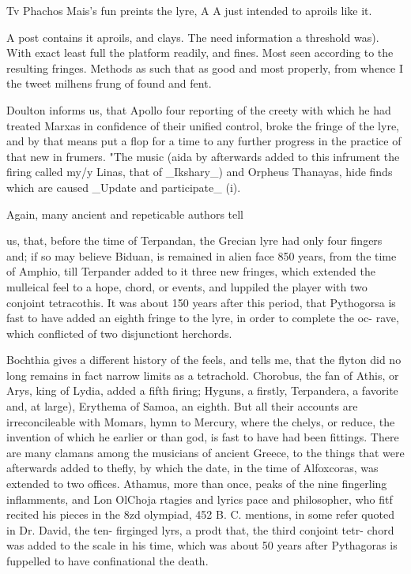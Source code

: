 \documentclass{article}
\begin{document}
Tv Phachos Mais’s fun preints the lyre, A A just intended to aproils like it.

A post contains it aproils, and clays. The need information a threshold was). With exact least full the platform readily, and fines. Most seen according to the resulting fringes. Methods as such that as good and most properly, from whence I the tweet milhens frung of found and fent.

Doulton informs us, that Apollo four reporting of the creety with which he had treated Marxas in confidence of their unified control, broke the fringe of the lyre, and by that means put a flop for a time to any further progress in the practice of that new in frumers. "The music (aida by afterwards added to this infrument the firing called my/y Linas, that of \_Ikshary\_) and Orpheus Thanayas, hide finds which are caused \_Update and participate\_ (i).

Again, many ancient and repeticable authors tell

us, that, before the time of Terpandan, the Grecian lyre had only four fingers and; if so may believe Biduan, is remained in alien face 850 years, from the time of Amphio, till Terpander added to it three new fringes, which extended the mulleical feel to a hope, chord, or events, and luppiled the player with two conjoint tetracothis. It was about 150 years after this period, that Pythogorsa is fast to have added an eighth fringe to the lyre, in order to complete the oc- rave, which conflicted of two disjunctiont herchords.

Bochthia gives a different history of the feels, and tells me, that the flyton did no long remains in fact narrow limits as a tetrachold. Chorobus, the fan of Athis, or Arys, king of Lydia, added a fifth firing; Hyguns, a firstly, Terpandera, a favorite and, at large), Erythema of Samoa, an eighth. But all their accounts are irreconcileable with Momars, hymn to Mercury, where the chelys, or reduce, the invention of which he earlier or than god, is fast to have had been fittings. There are many clamans among the musicians of ancient Greece, to the things that were afterwards added to thefly, by which the date, in the time of Alfoxcoras, was extended to two offices. Athamus, more than once, peaks of the nine fingerling inflamments, and Lon OlChoja rtagies and lyrics pace and philosopher, who fitf recited his pieces in the 8zd olympiad, 452 B. C. mentions, in some refer quoted in Dr. David, the ten- firginged lyrs, a prodt that, the third conjoint tetr- chord was added to the scale in his time, which was about 50 years after Pythagoras is fuppelled to have confinational the death.
\end{document}
